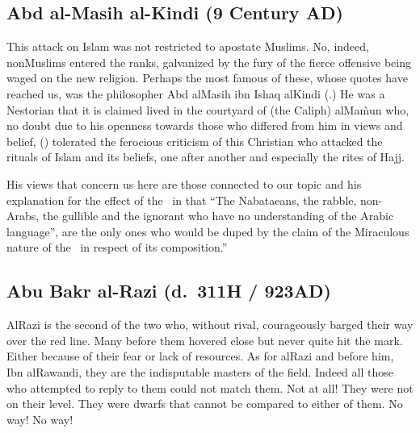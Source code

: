 \documentclass[12pt]{memoir}
\begin{document}


\subsection{Abd al-Masih al-Kindi (9 Century AD)}

This attack on Islam was not restricted to apostate Muslims.
No, indeed, non\–Muslims entered the ranks,
galvanized by the fury of the fierce offensive
being waged on the new religion.
Perhaps the most famous of these, whose quotes
have reached us, was the philosopher Abd al\–Masih ibn Ishaq al\–Kindi
(.)\@
He was a Nestorian that it is claimed lived in the courtyard of (the Caliph)
al\–Ma\`mun who, no doubt due to his openness towards those
who differed from him in views and belief,
()
tolerated the ferocious criticism of this
Christian who attacked the rituals of Islam and its beliefs, one after another
and especially the rites of Hajj.

His views that concern us here are those connected to our topic and his
explanation for the effect of the \Quran\ in that “The Nabataeans, the rabble,
non-Arabs, the gullible and the ignorant who have no understanding of the
Arabic language”, are the only ones who would be duped by the claim of the
Miraculous nature of the \Quran\ in respect of its composition.”\fnmark



\subsection{Abu Bakr al-Razi (d.\ 311H / 923AD)}

Al\–Razi is the second of the two who, without rival,
courageously barged their way over the red line.
Many before them hovered close but never quite hit the mark.
Either because of their fear or lack of resources.
As for al\–Razi and before him, Ibn al\–Rawandi, they are the indisputable
masters of the field.
Indeed all those who attempted to reply to them could not match them.
Not at all! They were not on their level.
They were dwarfs that cannot be compared to either of them.
No way! No way!
\end{document}
